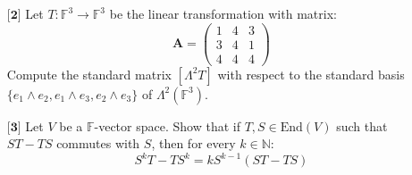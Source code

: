 \documentclass[12pt]{article}
\DeclarePairedDelimiter\set\{\}
\begin{document}
\begin{itemize}
\begin{itemize}
\begin{proof}
        Now take any function $\pi$ from Hom$(V,W)$. We can define it its values when inputting the basis of $V$ as $\pi(v_i)\in W$. Meaning when $i \in {1,2,\dots, n}$ and $\alpha_{ij}$ as a scalar, we can express $\pi(v_i)$ as,
        \begin{align*}
            \pi(v_i) = \sum_{j}^m \alpha_{ij}w_j
        \end{align*} 
        Which means,
        \begin{align*}
            \pi = \sum_{i,j}^{n,m} \alpha_{ij}\pi_{ij}
        \end{align*}
        because the linear functions agree on basis vectors. This means for $1 \leq i \leq n$ and $1 \leq j \leq m$,
        \[\text{Hom}(V,W) = \text{span}(\set{\pi_{ij}})\]

        This is the proof since we know there are $\text{dim}(V)\text{dim}(W)$ of these functions. 

    \end{proof}
    
    \vspace{.3cm}
    \item[(b)]
    Show that $\text{Hom}(V,V) \cong V \otimes V^*$.
    
    \end{itemize}
    
    \vspace{.5cm}
    \item[$\textbf{[2]}$]
    Let $T: \mathbb{F}^3 \rightarrow \mathbb{F}^3$ be the linear transformation with matrix:
    \begin{equation*}
    \mathbf{A} = \begin{pmatrix}
    1 & 4 & 3 \\
    3 & 4 & 1 \\
    4 & 4 & 4
    \end{pmatrix}
    \end{equation*}
    Compute the standard matrix $[\Lambda^2 T]$ with respect to the standard basis $\{e_1 \wedge e_2, e_1 \wedge e_3, e_2 \wedge e_3\}$ of $\Lambda^2(\mathbb{F}^3)$. 
    
    \vspace{.5cm}
    \item[$\textbf{[3]}$]
    Let $V$ be a $\mathbb{F}$-vector space. Show that if $T,S \in \text{End}(V)$ such that $ST - TS$ commutes with $S$, then for every $k \in \mathbb{N}$:
    \begin{equation*}
    S^kT - TS^k = kS^{k-1}(ST - TS)
    \end{equation*} 
    

\end{itemize}
\end{document}
